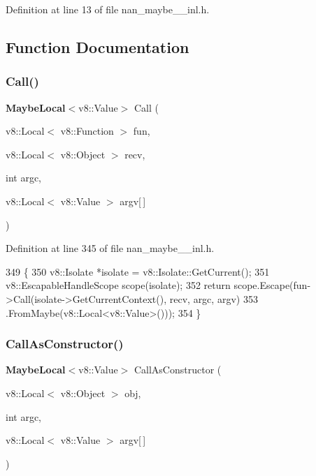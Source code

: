 Definition at line 13 of file nan\+\_\+maybe\+\_\+\_\+inl.\+h.



\subsection{Function Documentation}
\mbox{\label{nan__maybe__43__inl_8h_a039813a5e5f26556ff53cf377e36e5d3}} 
\subsubsection{Call()}
{\footnotesize\ttfamily \textbf{ Maybe\+Local}$<$v8\+::\+Value$>$ Call (\begin{DoxyParamCaption}\item[{v8\+::\+Local$<$ v8\+::\+Function $>$}]{fun,  }\item[{v8\+::\+Local$<$ v8\+::\+Object $>$}]{recv,  }\item[{int}]{argc,  }\item[{v8\+::\+Local$<$ v8\+::\+Value $>$}]{argv[$\,$] }\end{DoxyParamCaption})}



Definition at line 345 of file nan\+\_\+maybe\+\_\+\_\+inl.\+h.


\begin{DoxyCode}
349                              \{
350   v8::Isolate *isolate = v8::Isolate::GetCurrent();
351   v8::EscapableHandleScope scope(isolate);
352   \textcolor{keywordflow}{return} scope.Escape(fun->Call(isolate->GetCurrentContext(), recv, argc, argv)
353                           .FromMaybe(v8::Local<v8::Value>()));
354 \}
\end{DoxyCode}
\mbox{\label{nan__maybe__43__inl_8h_a5a8bb78780653712d737fb39f942a23e}} 
\subsubsection{Call\+As\+Constructor()}
{\footnotesize\ttfamily \textbf{ Maybe\+Local}$<$v8\+::\+Value$>$ Call\+As\+Constructor (\begin{DoxyParamCaption}\item[{v8\+::\+Local$<$ v8\+::\+Object $>$}]{obj,  }\item[{int}]{argc,  }\item[{v8\+::\+Local$<$ v8\+::\+Value $>$}]{argv[$\,$] }\end{DoxyParamCaption})}



